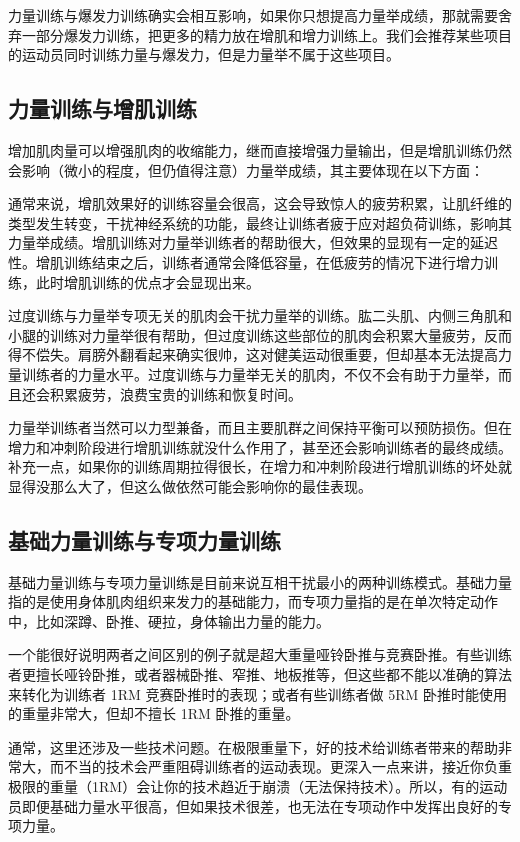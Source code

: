 \documentclass[fontset=fandol, a4paper, 12pt, openright]{ctexbook}
\begin{document}
力量训练与爆发力训练确实会相互影响，如果你只想提高力量举成绩，那就需要舍弃一部分爆发力训练，把更多的精力放在增肌和增力训练上。我们会推荐某些项目的运动员同时训练力量与爆发力，但是力量举不属于这些项目。

\subsection{力量训练与增肌训练}

增加肌肉量可以增强肌肉的收缩能力，继而直接增强力量输出，但是增肌训练仍然会影响（微小的程度，但仍值得注意）力量举成绩，其主要体现在以下方面：

通常来说，增肌效果好的训练容量会很高，这会导致惊人的疲劳积累，让肌纤维的类型发生转变，干扰神经系统的功能，最终让训练者疲于应对超负荷训练，影响其力量举成绩。增肌训练对力量举训练者的帮助很大，但效果的显现有一定的延迟性。增肌训练结束之后，训练者通常会降低容量，在低疲劳的情况下进行增力训练，此时增肌训练的优点才会显现出来。

过度训练与力量举专项无关的肌肉会干扰力量举的训练。肱二头肌、内侧三角肌和小腿的训练对力量举很有帮助，但过度训练这些部位的肌肉会积累大量疲劳，反而得不偿失。肩膀外翻看起来确实很帅，这对健美运动很重要，但却基本无法提高力量训练者的力量水平。过度训练与力量举无关的肌肉，不仅不会有助于力量举，而且还会积累疲劳，浪费宝贵的训练和恢复时间。

力量举训练者当然可以力型兼备，而且主要肌群之间保持平衡可以预防损伤。但在增力和冲刺阶段进行增肌训练就没什么作用了，甚至还会影响训练者的最终成绩。补充一点，如果你的训练周期拉得很长，在增力和冲刺阶段进行增肌训练的坏处就显得没那么大了，但这么做依然可能会影响你的最佳表现。

\subsection{基础力量训练与专项力量训练}

基础力量训练与专项力量训练是目前来说互相干扰最小的两种训练模式。基础力量指的是使用身体肌肉组织来发力的基础能力，而专项力量指的是在单次特定动作中，比如深蹲、卧推、硬拉，身体输出力量的能力。

一个能很好说明两者之间区别的例子就是超大重量哑铃卧推与竞赛卧推。有些训练者更擅长哑铃卧推，或者器械卧推、窄推、地板推等，但这些都不能以准确的算法来转化为训练者 1RM 竞赛卧推时的表现；或者有些训练者做 5RM 卧推时能使用的重量非常大，但却不擅长 1RM 卧推的重量。

通常，这里还涉及一些技术问题。在极限重量下，好的技术给训练者带来的帮助非常大，而不当的技术会严重阻碍训练者的运动表现。更深入一点来讲，接近你负重极限的重量（1RM）会让你的技术趋近于崩溃（无法保持技术）。所以，有的运动员即便基础力量水平很高，但如果技术很差，也无法在专项动作中发挥出良好的专项力量。
\end{document}
